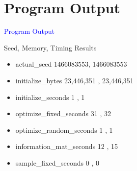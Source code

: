 \documentclass{beamer}
\newcommand{\Blue}[1]{\textcolor{blue}{#1}}
\newcommand{\Section}[1]{
	\section{#1}
	\begin{frame}
	\begin{center}
	\Blue{ \Large{#1} }
	\end{center}
	\end{frame}
}
\begin{document}
\Section{Program Output}
\begin{frame}{Seed, Memory, Timing Results}
\begin{itemize}

\item
actual\_seed
\hspace{5.9em} 1466083553, 1466083553
\pause

\item
initialize\_bytes
\hspace{4.6em} 23,446,351 , 23,446,351
\pause

\item
initialize\_seconds
\hspace{3.6em} 1 , 1
\pause

\item
optimize\_fixed\_seconds
\hspace{1.3em} 31 , 32
\pause

\item
optimize\_random\_seconds
\hspace{0.05em} 1 , 1
\pause

\item
information\_mat\_seconds
\hspace{0.25em} 12 , 15
\pause

\item
sample\_fixed\_seconds
\hspace{1.9em} 0 , 0
\pause

\end{itemize}
\end{frame}
\end{document}
